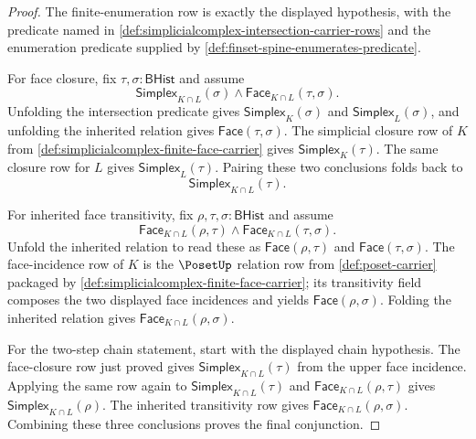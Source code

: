 \begin{proof}
The finite-enumeration row is exactly the displayed hypothesis, with the predicate named in \autoref{def:simplicialcomplex-intersection-carrier-rows} and the enumeration predicate supplied by \autoref{def:finset-spine-enumerates-predicate}.

For face closure, fix $\tau,\sigma:\mathsf{BHist}$ and assume
$$
\mathsf{Simplex}_{K\cap L}(\sigma)
\land
\mathsf{Face}_{K\cap L}(\tau,\sigma).
$$
Unfolding the intersection predicate gives $\mathsf{Simplex}_K(\sigma)$ and $\mathsf{Simplex}_L(\sigma)$, and unfolding the inherited relation gives $\mathsf{Face}(\tau,\sigma)$. The simplicial closure row of $K$ from \autoref{def:simplicialcomplex-finite-face-carrier} gives $\mathsf{Simplex}_K(\tau)$. The same closure row for $L$ gives $\mathsf{Simplex}_L(\tau)$. Pairing these two conclusions folds back to
$$
\mathsf{Simplex}_{K\cap L}(\tau).
$$

For inherited face transitivity, fix $\rho,\tau,\sigma:\mathsf{BHist}$ and assume
$$
\mathsf{Face}_{K\cap L}(\rho,\tau)
\land
\mathsf{Face}_{K\cap L}(\tau,\sigma).
$$
Unfold the inherited relation to read these as $\mathsf{Face}(\rho,\tau)$ and $\mathsf{Face}(\tau,\sigma)$. The face-incidence row of $K$ is the $\PosetUp$ relation row from \autoref{def:poset-carrier} packaged by \autoref{def:simplicialcomplex-finite-face-carrier}; its transitivity field composes the two displayed face incidences and yields $\mathsf{Face}(\rho,\sigma)$. Folding the inherited relation gives $\mathsf{Face}_{K\cap L}(\rho,\sigma)$.

For the two-step chain statement, start with the displayed chain hypothesis. The face-closure row just proved gives $\mathsf{Simplex}_{K\cap L}(\tau)$ from the upper face incidence. Applying the same row again to $\mathsf{Simplex}_{K\cap L}(\tau)$ and $\mathsf{Face}_{K\cap L}(\rho,\tau)$ gives $\mathsf{Simplex}_{K\cap L}(\rho)$. The inherited transitivity row gives $\mathsf{Face}_{K\cap L}(\rho,\sigma)$. Combining these three conclusions proves the final conjunction.
\end{proof}

